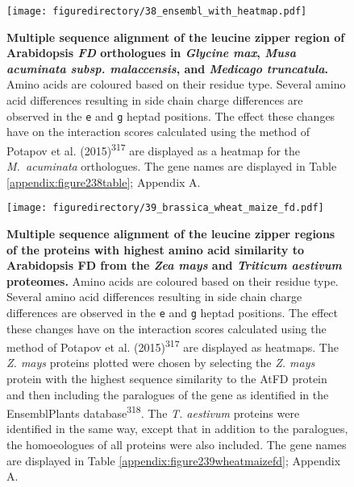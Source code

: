 \documentclass[12pt,]{book}
\begin{document}
\begin{figure}[htbp]
\centering
\texttt{[image: figuredirectory/38\_ensembl\_with\_heatmap.pdf]}
\caption{\textbf{Multiple sequence alignment of the leucine zipper
region of Arabidopsis \emph{FD} orthologues in \emph{Glycine max},
\emph{Musa acuminata subsp. malaccensis}, and \emph{Medicago
truncatula}.} Amino acids are coloured based on their residue type.
Several amino acid differences resulting in side chain charge
differences are observed in the \texttt{e} and \texttt{g} heptad
positions. The effect these changes have on the interaction scores
calculated using the method of Potapov et al.
(2015)\textsuperscript{317} are displayed as a heatmap for the
\emph{M.~acuminata} orthologues. The gene names are displayed in Table
\ref{appendix:figure238table}; Appendix A.}\label{figure:238:ensembl}
\end{figure}

\begin{figure}[htbp]
\centering
\texttt{[image: figuredirectory/39\_brassica\_wheat\_maize\_fd.pdf]}
\caption{\textbf{Multiple sequence alignment of the leucine zipper
regions of the proteins with highest amino acid similarity to
Arabidopsis FD from the \emph{Zea mays} and \emph{Triticum aestivum}
proteomes.} Amino acids are coloured based on their residue type.
Several amino acid differences resulting in side chain charge
differences are observed in the \texttt{e} and \texttt{g} heptad
positions. The effect these changes have on the interaction scores
calculated using the method of Potapov et al.
(2015)\textsuperscript{317} are displayed as heatmaps. The \emph{Z.
mays} proteins plotted were chosen by selecting the \emph{Z. mays}
protein with the highest sequence similarity to the AtFD protein and
then including the paralogues of the gene as identified in the
EnsemblPlants database\textsuperscript{318}. The \emph{T. aestivum}
proteins were identified in the same way, except that in addition to the
paralogues, the homoeologues of all proteins were also included. The
gene names are displayed in Table \ref{appendix:figure239wheatmaizefd};
Appendix A.}\label{figure:239:wheatmaizefd}
\end{figure}
\end{document}
